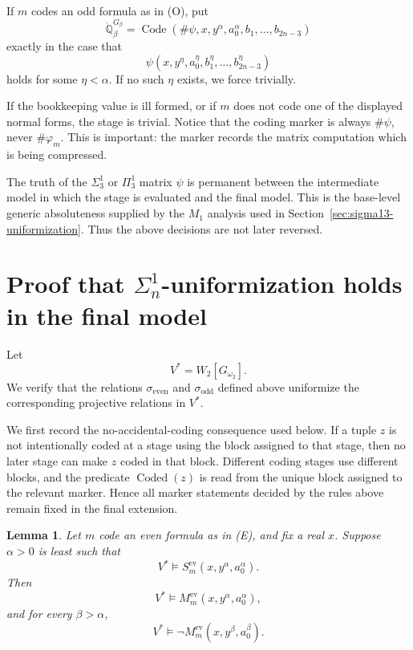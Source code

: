 \documentclass[a4paper,11pt]{article}
\newtheorem{lemma}[theorem]{Lemma}
\newcommand{\forceQ}{\mathbb{Q}}
\begin{document}
If $m$ codes an odd formula as in (O), put
\[
\dot{\forceQ}_\beta^{G_\beta}=
\operatorname{Code}(\#\psi,x,y^\alpha,a_0^\alpha,b_1,\ldots,b_{2n-3})
\]
exactly in the case that
\[
\psi(x,y^\eta,a_0^\eta,b_1^\eta,\ldots,b_{2n-3}^\eta)
\]
holds for some $\eta<\alpha$.  If no such $\eta$ exists, we force trivially.

If the bookkeeping value is ill formed, or if $m$ does not code one of the displayed normal forms, the stage is trivial.  Notice that the coding marker is always $\#\psi$, never $\#\varphi_m$.  This is important: the marker records the matrix computation which is being compressed.

The truth of the $\Sigma^1_3$ or $\Pi^1_3$ matrix $\psi$ is permanent between the intermediate model in which the stage is evaluated and the final model.  This is the base-level generic absoluteness supplied by the $M_1$ analysis used in Section~\ref{sec:sigma13-uniformization}.  Thus the above decisions are not later reversed.

\section{Proof that $\Sigma^1_n$-uniformization holds in the final model}

Let
\[
V^*=W_2[G_{\omega_2}].
\]
We verify that the relations $\sigma_{\mathrm{even}}$ and $\sigma_{\mathrm{odd}}$ defined above uniformize the corresponding projective relations in $V^*$.

We first record the no-accidental-coding consequence used below.  If a tuple $z$ is not intentionally coded at a stage using the block assigned to that stage, then no later stage can make $z$ coded in that block.  Different coding stages use different blocks, and the predicate $\operatorname{Coded}(z)$ is read from the unique block assigned to the relevant marker.  Hence all marker statements decided by the rules above remain fixed in the final extension.

\begin{lemma}\label{lemma:even-marker-verification}
Let $m$ code an even formula as in \textup{(E)}, and fix a real $x$.  Suppose $\alpha>0$ is least such that
\[
V^*\models S^{\mathrm{ev}}_m(x,y^\alpha,a_0^\alpha).
\]
Then
\[
V^*\models M^{\mathrm{ev}}_m(x,y^\alpha,a_0^\alpha),
\]
and for every $\beta>\alpha$,
\[
V^*\models \neg M^{\mathrm{ev}}_m(x,y^\beta,a_0^\beta).
\]
\end{lemma}
\end{document}
